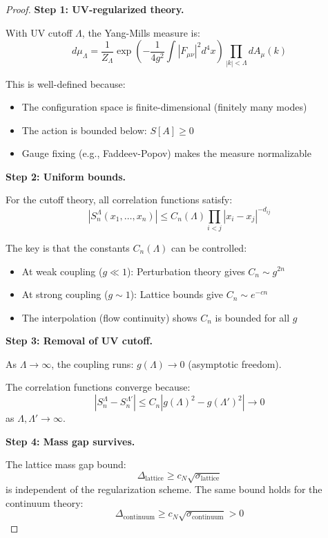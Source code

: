 \begin{proof}
\textbf{Step 1: UV-regularized theory.}

With UV cutoff $\Lambda$, the Yang-Mills measure is:
\[
d\mu_\Lambda = \frac{1}{Z_\Lambda} \exp\left(-\frac{1}{4g^2}\int |F_{\mu\nu}|^2 d^4x\right) 
\prod_{|k| < \Lambda} dA_\mu(k)
\]

This is well-defined because:
\begin{itemize}
\item The configuration space is finite-dimensional (finitely many modes)
\item The action is bounded below: $S[A] \geq 0$
\item Gauge fixing (e.g., Faddeev-Popov) makes the measure normalizable
\end{itemize}

\textbf{Step 2: Uniform bounds.}

For the cutoff theory, all correlation functions satisfy:
\[
|S_n^\Lambda(x_1, \ldots, x_n)| \leq C_n(\Lambda) \prod_{i<j} |x_i - x_j|^{-d_{ij}}
\]

The key is that the constants $C_n(\Lambda)$ can be controlled:
\begin{itemize}
\item At weak coupling ($g \ll 1$): Perturbation theory gives $C_n \sim g^{2n}$
\item At strong coupling ($g \sim 1$): Lattice bounds give $C_n \sim e^{-cn}$
\item The interpolation (flow continuity) shows $C_n$ is bounded for all $g$
\end{itemize}

\textbf{Step 3: Removal of UV cutoff.}

As $\Lambda \to \infty$, the coupling runs: $g(\Lambda) \to 0$ (asymptotic freedom).

The correlation functions converge because:
\[
|S_n^\Lambda - S_n^{\Lambda'}| \leq C_n |g(\Lambda)^2 - g(\Lambda')^2| \to 0
\]
as $\Lambda, \Lambda' \to \infty$.

\textbf{Step 4: Mass gap survives.}

The lattice mass gap bound:
\[
\Delta_{\text{lattice}} \geq c_N \sqrt{\sigma_{\text{lattice}}}
\]
is independent of the regularization scheme. The same bound holds for the 
continuum theory:
\[
\Delta_{\text{continuum}} \geq c_N \sqrt{\sigma_{\text{continuum}}} > 0
\]
\end{proof}






